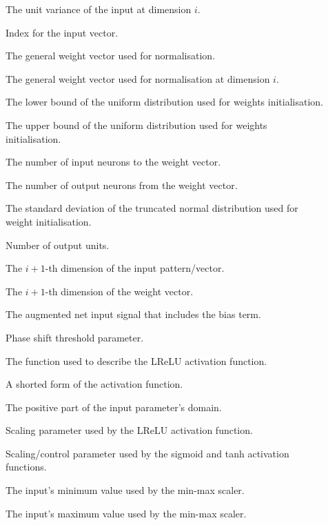 \begin{description}
	\item [\parbox{2cm}{$\sigma^2_i$}] The unit variance of the input at dimension $i$.
	\item [\parbox{2cm}{$i$}] Index for the input vector.
	\item [\parbox{2cm}{$\omega$}] The general weight vector used for normalisation.
	\item [\parbox{2cm}{$\omega_{i}$}] The general weight vector used for normalisation at dimension $i$.
	\item [\parbox{2cm}{$\omega_{min}$}] The lower bound of the uniform distribution used for weights initialisation.
	\item [\parbox{2cm}{$\omega_{max}$}] The upper bound of the uniform distribution used for weights initialisation.
	\item [\parbox{2cm}{$fanin$}] The number of input neurons to the weight vector.
	\item [\parbox{2cm}{$fanout$}] The number of output neurons from the weight vector.
	\item [\parbox{2cm}{$\sigma$}] The standard deviation of the truncated normal distribution used for weight initialisation.
	\item [\parbox{2cm}{$K$}] Number of output units.
	\item [\parbox{2cm}{$x_{i+1}$}] The $i+1$-th dimension of the input pattern/vector.
	\item [\parbox{2cm}{$v_{i+1}$}] The $i+1$-th dimension of the weight vector.
	\item [\parbox{2cm}{$net^{'}$}] The augmented net input signal that includes the bias term.
	\item [\parbox{2cm}{$\tau$}] Phase shift threshold parameter.
	\item [\parbox{2cm}{$f(x)$}] The function used to describe the \acs{LReLU} activation function.
	\item [\parbox{2cm}{$f$}] A shorted form of the activation function.
	\item [\parbox{2cm}{$x^{+}$}] The positive part of the input parameter's domain.
	\item [\parbox{2cm}{$\alpha$}] Scaling parameter used by the \acs{LReLU} activation function.
	\item [\parbox{2cm}{$\lambda$}] Scaling/control parameter used by the sigmoid and tanh activation functions.
	\item [\parbox{2cm}{$x_{min}$}] The input's minimum value used by the min-max scaler.
	\item [\parbox{2cm}{$x_{max}$}] The input's maximum value used by the min-max scaler.

\end{description}
